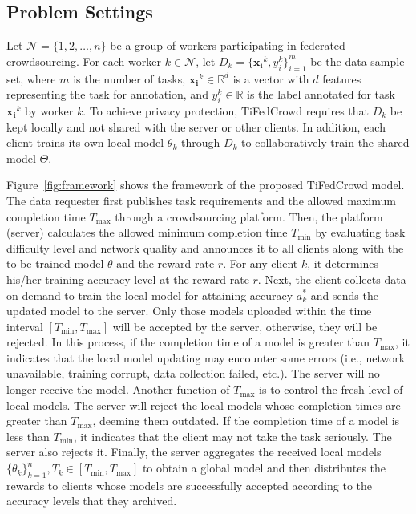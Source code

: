 \documentclass[final,1p,times]{elsarticle}
\begin{document}
\subsection{Problem Settings}
Let $\bm{\mathcal{N}} = \{1,2,\dots,n\}$ be a group of workers participating in federated crowdsourcing. For each worker $k\in\bm{\mathcal{N}}$, let $D_k=\{\bm{x_i}^k,y_i^k\}_{i=1}^m$ be the data sample set, where $m$ is the number of tasks, $\bm{x_i}^k\in\mathbb{R}^d$ is a vector with $d$ features representing the task for annotation, and $y_i^k\in\mathbb{R}$ is the label annotated for task $\bm{x_i}^k$ by worker $k$. To achieve privacy protection, TiFedCrowd requires that $D_k$ be kept locally and not shared with the server or other clients. In addition, each client trains its own local model $\theta_k$ through $D_k$ to collaboratively train the shared model $\Theta$.

Figure~\ref{fig:framework} shows the framework of the proposed TiFedCrowd model. The data requester first publishes task requirements and the allowed maximum completion time $T_{\max}$ through a crowdsourcing platform. Then, the platform (server) calculates the allowed minimum completion time $T_{\min}$ by evaluating task difficulty level and network quality and announces it to all clients along with the to-be-trained model $\theta$ and the reward rate $r$. For any client $k$, it determines his/her training accuracy level at the reward rate $r$. Next, the client collects data on demand to train the local model for attaining accuracy $a_k^\ast$ and sends the updated model to the server. Only those models uploaded within the time interval $[T_{\min},T_{\max}]$ will be accepted by the server, otherwise, they will be rejected. In this process, if the completion time of a model is greater than $T_{\max}$, it indicates that the local model updating may encounter some errors (i.e., network unavailable, training corrupt, data collection failed, etc.). The server will no longer receive the model. Another function of $T_{\max}$ is to control the fresh level of local models. The server will reject the local models whose completion times are greater than $T_{\max}$, deeming them outdated. If the completion time of a model is less than $T_{\min}$, it indicates that the client may not take the task seriously. The server also rejects it.  Finally, the server aggregates the received local models $\{\theta_k\}_{k=1}^n,T_k\in[T_{\min},T_{\max}]$ to obtain a global model and then distributes the rewards to clients whose models are successfully accepted according to the accuracy levels that they archived. 
\end{document}
